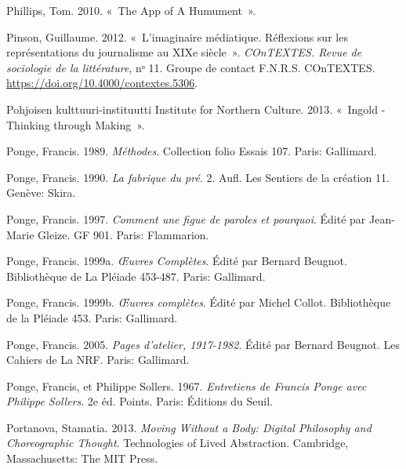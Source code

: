 \begin{CSLReferences}{1}{0}
\leavevmode{}%
Phillips, Tom. 2010. {«~The {App} of {A Humument}~»}.

\leavevmode{}%
Pinson, Guillaume. 2012. {«~{L'imaginaire m{é}diatique. R{é}flexions sur
les repr{é}sentations du journalisme au XIXe si{è}cle}~»}.
\emph{COnTEXTES. Revue de sociologie de la litt{é}rature}, nᵒ 11.
{Groupe de contact F.N.R.S. COnTEXTES}.
\url{https://doi.org/10.4000/contextes.5306}.

\leavevmode{}%
Pohjoisen kulttuuri-instituutti Institute for Northern Culture. 2013.
{«~Ingold - {Thinking} through {Making}~»}.

\leavevmode{}%
Ponge, Francis. 1989. \emph{{M{é}thodes}}. {Collection folio Essais}
107. {Paris}: {Gallimard}.

\leavevmode{}%
Ponge, Francis. 1990. \emph{{La fabrique du pr{é}}}. 2. Aufl. {Les
Sentiers de la cr{é}ation} 11. {Gen{è}ve}: {Skira}.

\leavevmode{}%
Ponge, Francis. 1997. \emph{{Comment une figue de paroles et pourquoi}}.
Édité par Jean-Marie Gleize. {GF} 901. {Paris}: {Flammarion}.

\leavevmode{}%
Ponge, Francis. 1999a. \emph{{Œ}uvres Compl{è}tes}. Édité par Bernard
Beugnot. Biblioth{è}que de La {Pl{é}iade} 453-487. {Paris}: {Gallimard}.

\leavevmode{}%
Ponge, Francis. 1999b. \emph{{{Œ}uvres compl{è}tes}}. Édité par Michel
Collot. {Biblioth{è}que de la Pl{é}iade} 453. {Paris}: {Gallimard}.

\leavevmode{}%
Ponge, Francis. 2005. \emph{Pages d'atelier, 1917-1982}. Édité par
Bernard Beugnot. Les Cahiers de La {NRF}. {Paris}: {Gallimard}.

\leavevmode{}%
Ponge, Francis, et Philippe Sollers. 1967. \emph{{Entretiens de Francis
Ponge avec Philippe Sollers}}. 2e {é}d. {Points}. {Paris}: {{É}ditions
du Seuil}.

\leavevmode{}%
Portanova, Stamatia. 2013. \emph{Moving {Without} a {Body}: {Digital
Philosophy} and {Choreographic Thought}}. Technologies of Lived
Abstraction. {Cambridge, Massachusetts}: {The MIT Press}.


\end{CSLReferences}

